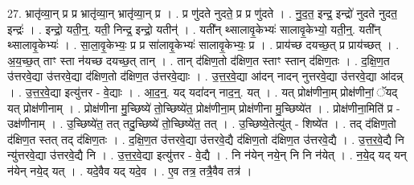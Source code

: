 \documentclass[17pt]{extarticle}
\begin{document}
27. भ्रातृ॑व्या॒न् प्र प्र भ्रातृ॑व्या॒न् भ्रातृ॑व्या॒न् प्र । . प्र णु॑दते नुदते॒ प्र प्र णु॑दते । . नु॒द॒त॒ इन्द्र॒ इन्द्रो॑ नुदते नुदत॒ इन्द्रः॑ । . इन्द्रो॒ यती॒न्॒. यती॒ निन्द्र॒ इन्द्रो॒ यतीन्॑ । . यती᳚न् थ्सालावृ॒केभ्यः॑ सालावृ॒केभ्यो॒ यती॒न्॒. यती᳚न् थ्सालावृ॒केभ्यः॑ । . सा॒ला॒वृ॒केभ्यः॒ प्र प्र सा॑लावृ॒केभ्यः॑ सालावृ॒केभ्यः॒ प्र । . प्राय॑च्छ दयच्छ॒त् प्र प्राय॑च्छत् । . अ॒य॒च्छ॒त् ताꣳ स्ता न॑यच्छ दयच्छ॒त् तान् । . तान् द॑क्षिण॒तो द॑क्षिण॒त स्ताꣳ स्तान् द॑क्षिण॒तः । . द॒क्षि॒ण॒त उ॑त्तरवे॒द्या उ॑त्तरवे॒द्या द॑क्षिण॒तो द॑क्षिण॒त उ॑त्तरवे॒द्याः । . उ॒त्त॒र॒वे॒द्या आ॑दन् नादन् नुत्तरवे॒द्या उ॑त्तरवे॒द्या आ॑दन्न् । . उ॒त्त॒र॒वे॒द्या इत्यु॑त्तर - वे॒द्याः । . आ॒द॒न्॒. यद् यदा॑दन् नाद॒न्॒. यत् । . यत् प्रोक्ष॑णीना॒म् प्रोक्ष॑णीनां॒ ॅयद् यत् प्रोक्ष॑णीनाम् । . प्रोक्ष॑णीना मु॒च्छिष्ये॑ तो॒च्छिष्ये॑त॒ प्रोक्ष॑णीना॒म् प्रोक्ष॑णीना मु॒च्छिष्ये॑त । . प्रोक्ष॑णीना॒मिति॑ प्र - उक्ष॑णीनाम् । . उ॒च्छिष्ये॑त॒ तत् तदु॒च्छिष्ये॑ तो॒च्छिष्ये॑त॒ तत् । . उ॒च्छिष्ये॒तेत्यु॑त् - शिष्ये॑त । . तद् द॑क्षिण॒तो द॑क्षिण॒त स्तत् तद् द॑क्षिण॒तः । . द॒क्षि॒ण॒त उ॑त्तरवे॒द्या उ॑त्तरवे॒द्यै द॑क्षिण॒तो द॑क्षिण॒त उ॑त्तरवे॒द्यै । . उ॒त्त॒र॒वे॒द्यै नि न्यु॑त्तरवे॒द्या उ॑त्तरवे॒द्यै नि । . उ॒त्त॒र॒वे॒द्या इत्यु॑त्तर - वे॒द्यै । . नि न॑येन् नये॒न् नि नि न॑येत् । . न॒ये॒द् यद् यन् न॑येन् नये॒द् यत् । . यदे॒वैव यद् यदे॒व । . ए॒व तत्र॒ तत्रै॒वैव तत्र॑ । \newline
\end{document}
